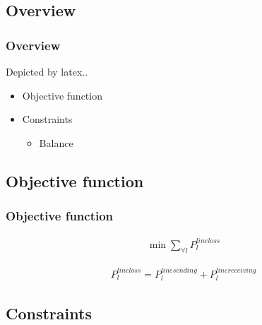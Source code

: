 \documentclass[
	11pt, %
	aspectratio=169, %
]{beamer}
\begin{document}
\subsection{Overview}

\begin{frame}
	\frametitle{Overview}
	Depicted by latex..
	\begin{itemize}
		\item Objective function
		\item Constraints
			\begin{itemize}
				\item Balance
			\end{itemize}
	\end{itemize}
\end{frame}


\subsection{Objective function}

\begin{frame}
	\frametitle{Objective function}
	\begin{align}
		\min{ \sum_{\forall l} {P_{l}^{line loss}} }
	\end{align}

	\begin{align}
		P_{l}^{line loss} = P_{l}^{line sending} + P_{l}^{line receiving}
	\end{align}
\end{frame}


\subsection{Constraints}
\end{document}
